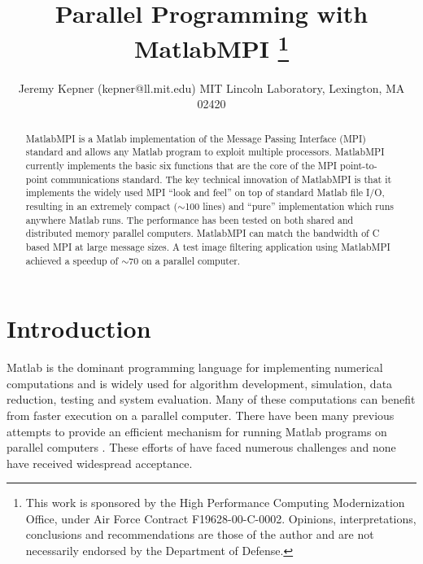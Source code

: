 \documentclass[11pt]{article}
\begin{document}

\title{Parallel Programming with MatlabMPI
\thanks{
This work is sponsored by the High Performance Computing Modernization
Office, under Air Force Contract
F19628-00-C-0002.  Opinions, interpretations, conclusions and
recommendations are those of the author and are not necessarily endorsed
by the Department of Defense.
}}

\author{Jeremy Kepner  (kepner@ll.mit.edu)
MIT Lincoln Laboratory, Lexington, MA  02420 \\
}
\maketitle


\begin{abstract}

  MatlabMPI is a Matlab implementation of the Message Passing Interface
(MPI) standard and allows any Matlab program to exploit multiple
processors. MatlabMPI currently implements the basic six functions that
are the core of the MPI point-to-point communications standard. The key
technical innovation of MatlabMPI is that it implements the widely used
MPI ``look and feel'' on top of standard Matlab file I/O, resulting in
an extremely compact ($\sim$100 lines) and ``pure'' implementation which runs
anywhere Matlab runs.  The performance has been tested on both shared
and distributed memory parallel computers.  MatlabMPI can match the
bandwidth of C based MPI at large message sizes. A test image filtering
application using MatlabMPI achieved a speedup of $\sim$70 on a parallel
computer.

\end{abstract}

\section{Introduction}

  Matlab \cite{Matlab} is the dominant programming language for
implementing numerical computations and is widely used for algorithm
development, simulation, data reduction, testing and system evaluation. 
Many of these computations can benefit from faster execution on a
parallel computer. There have been many previous attempts to provide an
efficient mechanism for running Matlab programs on parallel computers
\cite{MATABP,Morrow98,ParAl,RTExpress,Tseng99,MultiMATLAB,
      ParaMat,Fabozzi99,Matpar,MPITB,Quinn,CMTM}.
These efforts of have faced numerous challenges and none have
received widespread acceptance.
\end{document}
